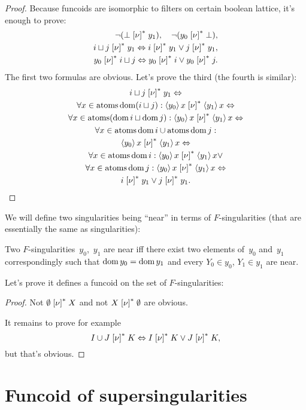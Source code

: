 \begin{proof}
Because funcoids are isomorphic to filters on certain boolean lattice, it's enough to prove:
\begin{align*}
\lnot(\bot\mathrel{\left[\nu\right]^{\ast}}y_1),\quad
\lnot(y_0\mathrel{\left[\nu\right]^{\ast}}\bot),\\
i\sqcup j\mathrel{\left[\nu\right]^{\ast}}y_1 \Leftrightarrow
i\mathrel{\left[\nu\right]^{\ast}}y_1\lor j\mathrel{\left[\nu\right]^{\ast}}y_1,\\
y_0\mathrel{\left[\nu\right]^{\ast}}i\sqcup j \Leftrightarrow
y_0\mathrel{\left[\nu\right]^{\ast}}i\lor y_0\mathrel{\left[\nu\right]^{\ast}}j.
\end{align*}
The first two formulas are obvious. Let's prove the third (the fourth is similar):
\begin{multline*}
i\sqcup j\mathrel{\left[\nu\right]^{\ast}}y_1 \Leftrightarrow\\
\forall x\in\operatorname{atoms}\operatorname{dom}(i\sqcup j):
\left\langle y_0\right\rangle x \mathrel{\left[\nu\right]^{\ast}} \left\langle y_1\right\rangle x \Leftrightarrow\\
\forall x\in\operatorname{atoms}(\operatorname{dom} i\sqcup\operatorname{dom} j):
\left\langle y_0\right\rangle x \mathrel{\left[\nu\right]^{\ast}} \left\langle y_1\right\rangle x \Leftrightarrow\\
\forall x\in\operatorname{atoms}\operatorname{dom} i\cup\operatorname{atoms}\operatorname{dom} j:\\
\left\langle y_0\right\rangle x \mathrel{\left[\nu\right]^{\ast}} \left\langle y_1\right\rangle x \Leftrightarrow\\
\forall x\in\operatorname{atoms}\operatorname{dom} i:
\left\langle y_0\right\rangle x \mathrel{\left[\nu\right]^{\ast}} \left\langle y_1\right\rangle x \lor\\
\forall x\in\operatorname{atoms}\operatorname{dom} j:
\left\langle y_0\right\rangle x \mathrel{\left[\nu\right]^{\ast}} \left\langle y_1\right\rangle x \Leftrightarrow\\
i\mathrel{\left[\nu\right]^{\ast}}y_1\lor j\mathrel{\left[\nu\right]^{\ast}}y_1.
\end{multline*}
\end{proof}

We will define two singularities being ``near'' 
in terms of $F$-singularities (that are essentially the same as singularities):

Two $F$-singularities~$y_0$,~$y_1$ are near iff
there exist two elements of~$y_0$ and~$y_1$ correspondingly such that $\operatorname{dom} y_0=\operatorname{dom} y_1$ and every $Y_0\in y_0$, $Y_1\in y_1$ are near.

Let's prove it defines a funcoid on the set of $F$-singularities:

\begin{proof}
Not $\emptyset\mathrel{\left[\nu\right]^{\ast}}X$ and not $X\mathrel{\left[\nu\right]^{\ast}}\emptyset$ are obvious.

It remains to prove for example
\[ I\cup J\mathrel{\left[\nu\right]^{\ast}}K \Leftrightarrow 
I\mathrel{\left[\nu\right]^{\ast}}K \lor J\mathrel{\left[\nu\right]^{\ast}}K, \]
but that's obvious.
\end{proof}

\chapter{Funcoid of supersingularities}

